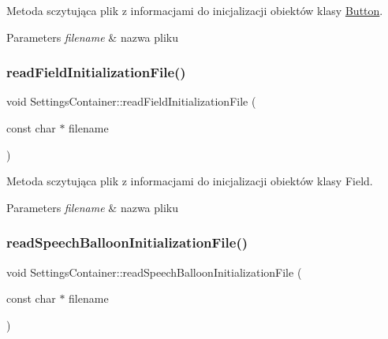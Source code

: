 Metoda sczytująca plik z informacjami do inicjalizacji obiektów klasy \mbox{\hyperlink{class_button}{Button}}. 


\begin{DoxyParams}{Parameters}
{\em filename} & nazwa pliku \\
\hline
\end{DoxyParams}
\mbox{\label{class_settings_container_a777b36e8fce724da732f4602cd54a7ab}} 
\subsubsection{\texorpdfstring{readFieldInitializationFile()}{readFieldInitializationFile()}}
{\footnotesize\ttfamily void Settings\+Container\+::read\+Field\+Initialization\+File (\begin{DoxyParamCaption}\item[{const char $\ast$}]{filename }\end{DoxyParamCaption})}



Metoda sczytująca plik z informacjami do inicjalizacji obiektów klasy Field. 


\begin{DoxyParams}{Parameters}
{\em filename} & nazwa pliku \\
\hline
\end{DoxyParams}
\mbox{\label{class_settings_container_a55e9d8fb7d663a5e625c3b7119a72611}} 
\subsubsection{\texorpdfstring{readSpeechBalloonInitializationFile()}{readSpeechBalloonInitializationFile()}}
{\footnotesize\ttfamily void Settings\+Container\+::read\+Speech\+Balloon\+Initialization\+File (\begin{DoxyParamCaption}\item[{const char $\ast$}]{filename }\end{DoxyParamCaption})}




